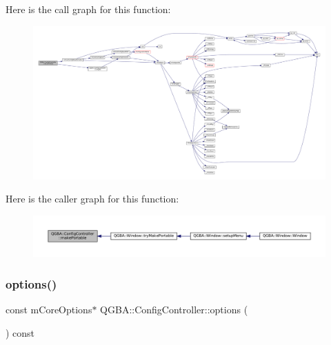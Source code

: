 Here is the call graph for this function\+:
\nopagebreak
\begin{figure}[H]
\begin{center}
\leavevmode
\includegraphics[width=350pt]{class_q_g_b_a_1_1_config_controller_af7cecd2d1e8b2c9f631d3b2cc47aec5f_cgraph}
\end{center}
\end{figure}
Here is the caller graph for this function\+:
\nopagebreak
\begin{figure}[H]
\begin{center}
\leavevmode
\includegraphics[width=350pt]{class_q_g_b_a_1_1_config_controller_af7cecd2d1e8b2c9f631d3b2cc47aec5f_icgraph}
\end{center}
\end{figure}
\mbox{\label{class_q_g_b_a_1_1_config_controller_a5935ec3402096eb3a4629a72a9872b03}} 
\subsubsection{\texorpdfstring{options()}{options()}}
{\footnotesize\ttfamily const m\+Core\+Options$\ast$ Q\+G\+B\+A\+::\+Config\+Controller\+::options (\begin{DoxyParamCaption}{ }\end{DoxyParamCaption}) const\hspace{0.3cm}{\ttfamily [inline]}}

